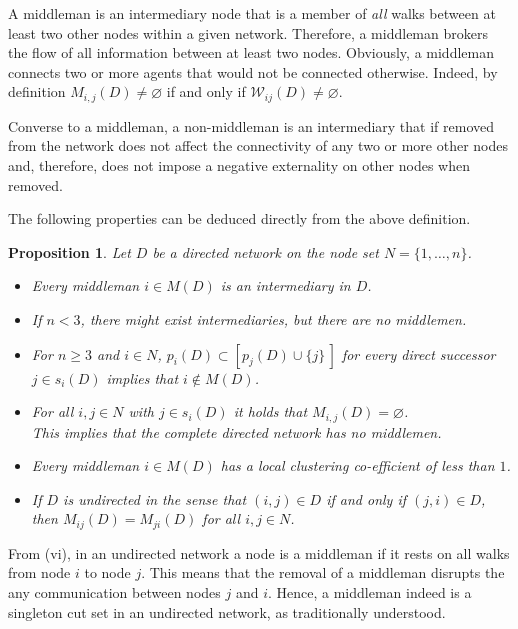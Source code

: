 \documentclass[11pt,fleqn]{article}
\newtheorem{proposition}[theorem]{Proposition}
\begin{document}
A middleman is an intermediary node that is a member of \emph{all} walks between at least two other nodes within a given network. Therefore, a middleman brokers the flow of all information between at least two nodes. Obviously, a middleman connects two or more agents that would not be connected otherwise. Indeed, by definition $M_{i,j} (D) \neq \varnothing$ if and only if $\mathcal{W}_{ij} (D) \neq \varnothing$.

Converse to a middleman, a non-middleman is an intermediary that if removed from the network does not affect the connectivity of any two or more other nodes and, therefore, does not impose a negative externality on other nodes when removed.

The following properties can be deduced directly from the above definition.

\begin{proposition}\label{TheoremIntermediary}
Let $D$ be a directed network on the node set $N = \{ 1, \ldots ,n \}$.
\begin{itemize}
\item[(i)] Every middleman $i \in M(D)$ is an intermediary in $D$. 

\item[(ii)] If $n < 3$, there might exist intermediaries, but there are no middlemen.

\item[(iii)] For $n \geqslant 3$ and $i \in N$, $p_{i}(D) \subset \left[ p_{j}(D) \cup \{ j \} \, \right]$ for every direct successor $j \in s_{i}(D)$ implies that $i \notin M(D)$.

\item[(iv)] For all $i,j \in N$ with $j \in s_{i}(D)$ it holds that $M_{i,j}(D) = \varnothing$.
\\
This implies that the complete directed network has no middlemen.

\item[(v)] Every middleman $i \in M(D)$ has a local clustering co-efficient of less than $1$.

\item[(vi)] If $D$ is undirected in the sense that $(i,j) \in D$ if and only if $(j,i) \in D$, then $M_{ij} (D) = M_{ji} (D)$ for all $i,j \in N$.
\end{itemize}
\end{proposition}

From (vi), in an undirected network a node is a middleman if it rests on all walks from node $i$ to node $j$. This means that the removal of a middleman disrupts the any communication between nodes $j$ and $i$. Hence, a middleman indeed is a singleton cut set in an undirected network, as traditionally understood.
\end{document}
